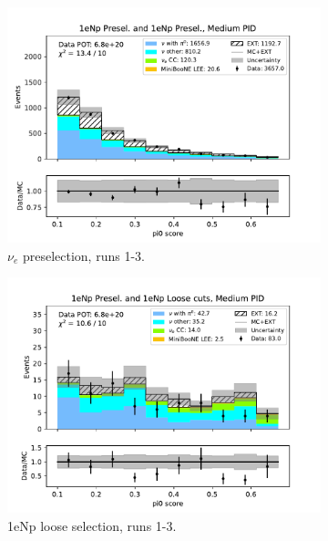 \begin{figure}[H]
    \centering
    \begin{subfigure}{0.5\linewidth}
        \includegraphics[width=\linewidth]{technote/Sidebands/Figures/NearSideband/near_sideband_pi0_score_run123_NP_NP_MEDIUM_PID.pdf}
        \caption{$\nu_e$ preselection, runs 1-3.}
    \end{subfigure}%
    \begin{subfigure}{0.5\linewidth}
        \includegraphics[width=\linewidth]{technote/Sidebands/Figures/NearSideband/near_sideband_pi0_score_run123_NP_NPL_MEDIUM_PID.pdf}
        \caption{1eNp loose selection, runs 1-3.}
    \end{subfigure}
    \begin{subfigure}{0.5\linewidth}

\end{subfigure}
\end{figure}
